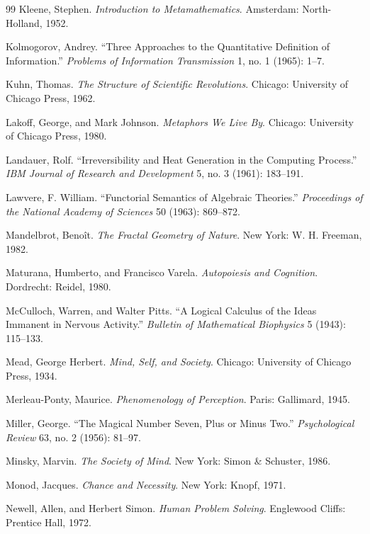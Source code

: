 \documentclass[12pt,openany]{book}
\theoremstyle{plain}
\theoremstyle{definition}
\theoremstyle{remark}
\begin{document}
\begin{thebibliography}{99}
Kleene, Stephen.
\textit{Introduction to Metamathematics}.
Amsterdam: North-Holland, 1952.

Kolmogorov, Andrey.
``Three Approaches to the Quantitative Definition of Information.''
\textit{Problems of Information Transmission} 1, no. 1 (1965): 1--7.

Kuhn, Thomas.
\textit{The Structure of Scientific Revolutions}.
Chicago: University of Chicago Press, 1962.

Lakoff, George, and Mark Johnson.
\textit{Metaphors We Live By}.
Chicago: University of Chicago Press, 1980.

Landauer, Rolf.
``Irreversibility and Heat Generation in the Computing Process.''
\textit{IBM Journal of Research and Development} 5, no. 3 (1961): 183--191.

Lawvere, F. William.
``Functorial Semantics of Algebraic Theories.''
\textit{Proceedings of the National Academy of Sciences} 50 (1963): 869--872.

Mandelbrot, Benoît.
\textit{The Fractal Geometry of Nature}.
New York: W. H. Freeman, 1982.

Maturana, Humberto, and Francisco Varela.
\textit{Autopoiesis and Cognition}.
Dordrecht: Reidel, 1980.

McCulloch, Warren, and Walter Pitts.
``A Logical Calculus of the Ideas Immanent in Nervous Activity.''
\textit{Bulletin of Mathematical Biophysics} 5 (1943): 115--133.

Mead, George Herbert.
\textit{Mind, Self, and Society}.
Chicago: University of Chicago Press, 1934.

Merleau-Ponty, Maurice.
\textit{Phenomenology of Perception}.
Paris: Gallimard, 1945.

Miller, George.
``The Magical Number Seven, Plus or Minus Two.''
\textit{Psychological Review} 63, no. 2 (1956): 81--97.

Minsky, Marvin.
\textit{The Society of Mind}.
New York: Simon \& Schuster, 1986.

Monod, Jacques.
\textit{Chance and Necessity}.
New York: Knopf, 1971.

Newell, Allen, and Herbert Simon.
\textit{Human Problem Solving}.
Englewood Cliffs: Prentice Hall, 1972.


\end{thebibliography}
\end{document}
